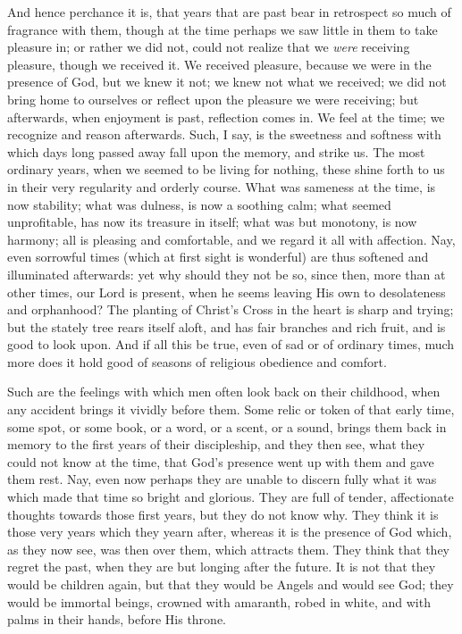 And hence perchance it is, that years that are past bear in
retrospect so much of fragrance with them, though at the time perhaps
we saw little in them to take pleasure in; or rather we did not, could
not realize that we \emph{were} receiving pleasure, though we received
it. We received pleasure, because we were in the presence of God, but
we knew it not; we knew not what we received; we did not bring home to
ourselves or reflect upon the pleasure we were receiving; but
afterwards, when enjoyment is past, reflection comes in. We feel at
the time; we recognize and reason afterwards. Such, I say, is the
sweetness and softness with which days long passed away fall upon the
memory, and strike us. The most ordinary years, when we seemed to be
living for nothing, these shine forth to us in their very regularity
and orderly course. What was sameness at the time, is now stability;
what was dulness, is now a soothing calm; what seemed unprofitable,
has now its treasure in itself; what was but monotony, is now harmony;
all is pleasing and comfortable, and we regard it all with affection.
Nay, even sorrowful times (which at first sight is wonderful) are thus
softened and illuminated afterwards: yet why should they not be so,
since then, more than at other times, our Lord is present, when he
seems leaving His own to desolateness and orphanhood? The planting of
Christ's Cross in the heart is sharp and trying; but the stately
tree rears itself aloft, and has fair branches and rich fruit, and is
good to look upon. And if all this be true, even of sad or of ordinary
times, much more does it hold good of seasons of religious obedience
and comfort.

Such are the feelings with which men often look back on their
childhood, when any accident brings it vividly before them. Some relic
or token of that early time, some spot, or some book, or a word, or a
scent, or a sound, brings them back in memory to the first years of
their discipleship, and they then see, what they could not know at the
time, that God's presence went up with them and gave them rest. Nay,
even now perhaps they are unable to discern fully what it was which
made that time so bright and glorious. They are full of tender,
affectionate thoughts towards those first years, but they do not know
why. They think it is those very years which they yearn after, whereas
it is the presence of God which, as they now see, was then over them,
which attracts them. They think that they regret the past, when they
are but longing after the future. It is not that they would be
children again, but that they would be Angels and would see God; they
would be immortal beings, crowned with amaranth, robed in white, and
with palms in their hands, before His throne.

